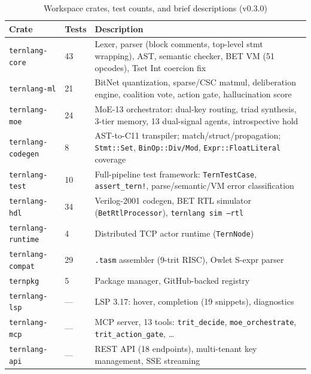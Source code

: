 \documentclass[journal,10pt,twocolumn]{IEEEtran}
\begin{document}
\begin{table}[h]
\centering
\small
\caption{Workspace crates, test counts, and brief descriptions (v0.3.0)}
\label{tab:status}
\begin{tabular}{p{2.5cm}lp{5.5cm}}
\toprule
Crate & Tests & Description \\
\midrule
\texttt{ternlang-core}    & 43  & Lexer, parser (block comments, top-level stmt wrapping), AST, semantic checker, BET VM (51 opcodes), Tset Int coercion fix \\
\texttt{ternlang-ml}      & 21  & BitNet quantization, sparse/CSC matmul, deliberation engine, coalition vote, action gate, hallucination score \\
\texttt{ternlang-moe}     & 24  & MoE-13 orchestrator: dual-key routing, triad synthesis, 3-tier memory, 13 dual-signal agents, introspective hold \\
\texttt{ternlang-codegen} & 8   & AST-to-C11 transpiler; match/struct/propagation; \texttt{Stmt::Set}, \texttt{BinOp::Div/Mod}, \texttt{Expr::FloatLiteral} coverage \\
\texttt{ternlang-test}    & 10  & Full-pipeline test framework: \texttt{TernTestCase}, \texttt{assert\_tern!}, parse/semantic/VM error classification \\
\texttt{ternlang-hdl}     & 34  & Verilog-2001 codegen, BET RTL simulator (\texttt{BetRtlProcessor}), \texttt{ternlang sim --rtl} \\
\texttt{ternlang-runtime} & 4   & Distributed TCP actor runtime (\texttt{TernNode}) \\
\texttt{ternlang-compat}  & 29  & \texttt{.tasm} assembler (9-trit RISC), Owlet S-expr parser \\
\texttt{ternpkg}          & 5   & Package manager, GitHub-backed registry \\
\texttt{ternlang-lsp}     & --- & LSP 3.17: hover, completion (19 snippets), diagnostics \\
\texttt{ternlang-mcp}     & --- & MCP server, 13 tools: \texttt{trit\_decide}, \texttt{moe\_orchestrate}, \texttt{trit\_action\_gate}, \ldots \\
\texttt{ternlang-api}     & --- & REST API (18 endpoints), multi-tenant key management, SSE streaming \\
\bottomrule
\end{tabular}
\end{table}
\end{document}

